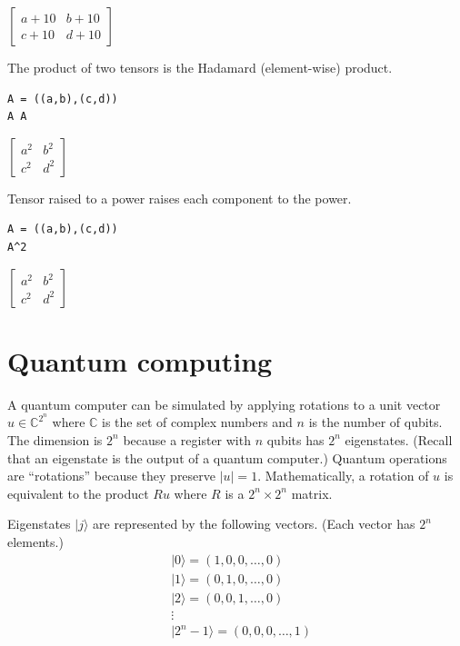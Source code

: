 \documentclass[12pt]{article}
\begin{document}
$\displaystyle
\begin{bmatrix}
a+10 & b+10
\\[1ex]
c+10 & d+10
\end{bmatrix}
$

\bigskip
The product of two tensors is the Hadamard (element-wise) product.

{\color{blue}
\begin{verbatim}
A = ((a,b),(c,d))
A A
\end{verbatim}}

$\displaystyle
\begin{bmatrix}
a^2 & b^2
\\[1ex]
c^2 & d^2
\end{bmatrix}
$

\bigskip

Tensor raised to a power raises each component to the power.

{\color{blue}
\begin{verbatim}
A = ((a,b),(c,d))
A^2
\end{verbatim}}

$\displaystyle
\begin{bmatrix}
a^2 & b^2
\\[1ex]
c^2 & d^2
\end{bmatrix}
$

\newpage

\section{Quantum computing}

A quantum computer can be simulated by applying rotations to a
unit vector
$u\in\mathbb{C}^{2^n}$ where $\mathbb{C}$ is the set of complex numbers
and $n$ is the number of qubits.
The dimension is $2^n$ because a register with $n$ qubits
has $2^n$ eigenstates.
(Recall that an eigenstate is the output of a quantum computer.)
Quantum operations are ``rotations'' because they preserve $|u|=1$.
Mathematically, a rotation of $u$ is equivalent to the product $Ru$
where $R$ is a $2^n\times2^n$ matrix.

\bigskip
Eigenstates $|j\rangle$ are represented by the following vectors.
(Each vector has $2^n$ elements.)
\begin{align*}
&|0\rangle=(1,0,0,\dots,0)
\\
&|1\rangle=(0,1,0,\ldots,0)
\\
&|2\rangle=(0,0,1,\ldots,0)
\\
&\vdots
\\
&|2^n-1\rangle=(0,0,0,\ldots,1)
\end{align*}
\end{document}
